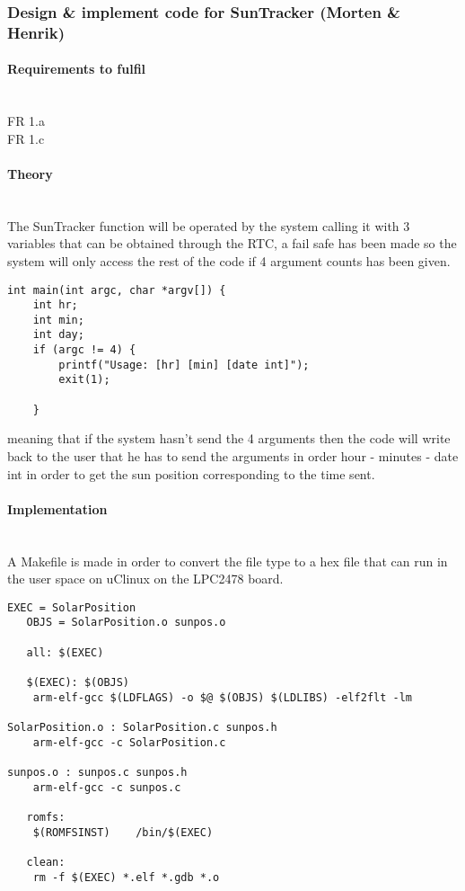 \subsubsection{Design \& implement code for SunTracker (Morten \& Henrik)}
\paragraph{Requirements to fulfil}\mbox{}\\
FR 1.a\\
FR 1.c

\paragraph{Theory}\mbox{}\\
The SunTracker function will be operated by the system calling it with 3 variables that can be obtained through the RTC, a fail safe has been made so the system will only access the rest of the code if 4 argument counts has been given.
\begin{verbatim}
int main(int argc, char *argv[]) {
	int hr;
	int min;
	int day;
	if (argc != 4) {
		printf("Usage: [hr] [min] [date int]");
		exit(1);

	}
\end{verbatim}

meaning that if the system hasn't send the 4 arguments then the code will write back to the user that he has to send the arguments in order hour - minutes - date int in order to get the sun position corresponding to the time sent.

\paragraph{Implementation}\mbox{}\\
A Makefile is made in order to convert the file type to a hex file that can run in the user space on uClinux on the LPC2478 board. 
\begin{verbatim}
EXEC = SolarPosition
   OBJS = SolarPosition.o sunpos.o
 
   all: $(EXEC)
 
   $(EXEC): $(OBJS)
	arm-elf-gcc $(LDFLAGS) -o $@ $(OBJS) $(LDLIBS) -elf2flt -lm

SolarPosition.o : SolarPosition.c sunpos.h 
	arm-elf-gcc -c SolarPosition.c
 
sunpos.o : sunpos.c sunpos.h
	arm-elf-gcc -c sunpos.c

   romfs:
	$(ROMFSINST)    /bin/$(EXEC)
 
   clean:
	rm -f $(EXEC) *.elf *.gdb *.o
\end{verbatim}


